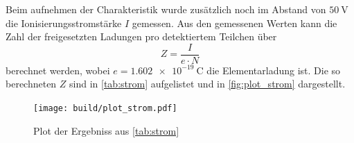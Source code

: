 Beim aufnehmen der Charakteristik wurde zusätzlich noch im Abstand von $\SI{50}{\volt}$ die Ionisierungsstromstärke $I$ gemessen.
Aus den gemessenen Werten kann die Zahl der freigesetzten Ladungen pro detektiertem Teilchen über
\begin{equation}
    Z = \frac{I}{e \cdot N}
\end{equation}
berechnet werden, wobei $e=\SI{1.602e-19}{\coulomb}$ die Elementarladung ist.
Die so berechneten $Z$ sind in \autoref{tab:strom} aufgelistet und in \autoref{fig:plot_strom} dargestellt.

\begin{figure}
    \centering
    \texttt{[image: build/plot\_strom.pdf]}
    \caption{Plot der Ergebniss aus \autoref{tab:strom}}
    \label{fig:plot_strom}
\end{figure}